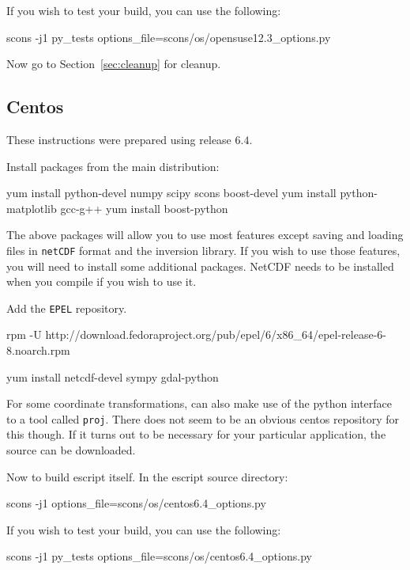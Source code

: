 \noindent If you wish to test your build, you can use the following:
\begin{shellCode}
scons -j1 py_tests options_file=scons/os/opensuse12.3_options.py 
\end{shellCode}

\noindent Now go to Section~\ref{sec:cleanup} for cleanup.

\subsection{Centos}\label{sec:centossrc}
These instructions were prepared using release $6.4$.

\noindent Install packages from the main distribution:
\begin{shellCode}
yum install python-devel numpy scipy scons boost-devel
yum install python-matplotlib gcc-g++
yum install boost-python 
\end{shellCode}

The above packages will allow you to use most features except saving and loading files in \texttt{netCDF} 
format and the \downunder inversion library.
If you wish to use those features, you will need to install some additional packages.
NetCDF needs to be installed when you compile if you wish to use it.
\begin{optionalstep}
\noindent Add the \texttt{EPEL} repository.
\begin{shellCode}
rpm -U http://download.fedoraproject.org/pub/epel/6/x86_64/epel-release-6-8.noarch.rpm
\end{shellCode}

\begin{shellCode}
yum install netcdf-devel sympy gdal-python
\end{shellCode}
\end{optionalstep}

\noindent For some coordinate transformations, \downunder can also make use of the python interface to a tool called \texttt{proj}.
There does not seem to be an obvious centos repository for this though.
If it turns out to be necessary for your particular application, the source can be downloaded. 

\noindent Now to build escript itself.
In the escript source directory:
\begin{shellCode}
scons -j1 options_file=scons/os/centos6.4_options.py
\end{shellCode}

\noindent If you wish to test your build, you can use the following:
\begin{shellCode}
scons -j1 py_tests options_file=scons/os/centos6.4_options.py 
\end{shellCode}

